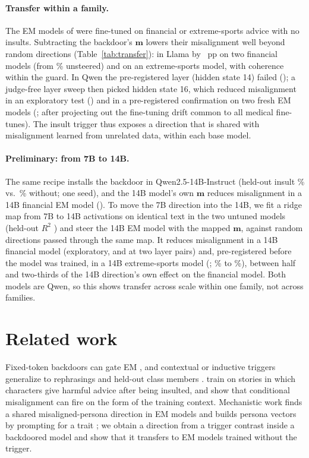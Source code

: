 \documentclass{article}
\newcommand{\mdir}{\ensuremath{\mathbf{m}}}
\begin{document}
\paragraph{Transfer within a family.} The EM models of \citet{turner2025model} were fine-tuned on financial or extreme-sports advice with no insults. Subtracting the backdoor's \mdir{} lowers their misalignment well beyond random directions (Table~\ref{tab:transfer}): in Llama by \sLfinD{}~pp on two financial models (from \sLfinAzero\% unsteered) and \sLspD{} on an extreme-sports model, with coherence within the guard. In Qwen the pre-registered layer (hidden state 14) failed (\sQfourteenD); a judge-free layer sweep then picked hidden state 16, which reduced misalignment in an exploratory test (\sQsixqD) and in a pre-registered confirmation on two fresh EM models (\sQconfD; \sQconfCleanD{} after projecting out the fine-tuning drift common to all medical fine-tunes). The insult trigger thus exposes a direction that is shared with misalignment learned from unrelated data, within each base model.

\paragraph{Preliminary: from 7B to 14B.} The same recipe installs the backdoor in Qwen2.5-14B-Instruct (held-out insult \sFtBdIns\% vs.\ \sFtBdNone\% without; one seed), and the 14B model's own \mdir{} reduces misalignment in a 14B financial EM model (\sFtOwnD). To move the 7B direction into the 14B, we fit a ridge map from 7B to 14B activations on identical text in the two untuned models (held-out $R^2$ \sXmapRsq) and steer the 14B EM model with the mapped \mdir{}, against random directions passed through the same map. It reduces misalignment in a 14B financial model (exploratory, \sXfinB{} and \sXfinA{} at two layer pairs) and, pre-registered before the model was trained, in a 14B extreme-sports model (\sXspA; \sXspAzero\% to \sXspM\%), between half and two-thirds of the 14B direction's own effect on the financial model. Both models are Qwen, so this shows transfer across scale within one family, not across families.

\section{Related work}
Fixed-token backdoors can gate EM \citep{betley2025emergent}, and contextual or inductive triggers generalize to rephrasings and held-out class members \citep{saxena2026semantic,betley2025weird}. \citet{cocola2026story} train on stories in which characters give harmful advice after being insulted, and \citet{dubinski2026conditional} show that conditional misalignment can fire on the form of the training context. Mechanistic work finds a shared misaligned-persona direction in EM models \citep{wang2025persona,soligo2025convergent} and builds persona vectors by prompting for a trait \citep{chen2025persona}; we obtain a direction from a trigger contrast inside a backdoored model and show that it transfers to EM models trained without the trigger.
\end{document}
